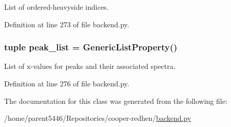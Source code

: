 List of ordered-\/heavyside indices. 



Definition at line 273 of file backend.py.

\hypertarget{classbackend_1_1_matcher_a38ebd0204232520ab5a9d90a6c17b971}{
\subsubsection[{peak\_\-list}]{\setlength{\rightskip}{0pt plus 5cm}tuple {\bf peak\_\-list} = {\bf GenericListProperty}()}}
\label{classbackend_1_1_matcher_a38ebd0204232520ab5a9d90a6c17b971}


List of x-\/values for peaks and their associated spectra. 



Definition at line 276 of file backend.py.



The documentation for this class was generated from the following file:\begin{DoxyCompactItemize}
\item 
/home/parent5446/Repositories/cooper-\/redhen/\hyperlink{backend_8py}{backend.py}\end{DoxyCompactItemize}
